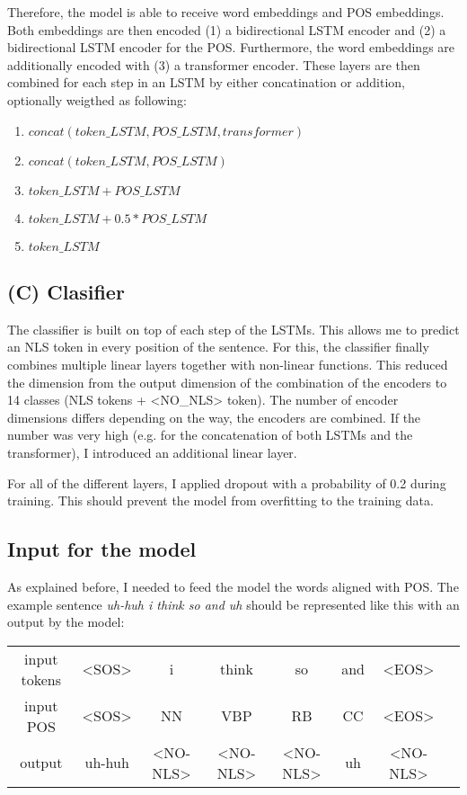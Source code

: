 \documentclass[
	11pt, %
]{fphw}
\begin{document}
Therefore, the model is able to receive word embeddings and POS embeddings. Both embeddings are then encoded (1) a bidirectional LSTM encoder and (2) a bidirectional LSTM encoder for the POS. Furthermore, the word embeddings are additionally encoded with (3) a transformer encoder. These layers are then combined for each step in an LSTM by either concatination or addition, optionally weigthed as following:
\begin{enumerate}
    \item $concat(token\_LSTM, POS\_LSTM, transformer)$
    \item $concat(token\_LSTM, POS\_LSTM)$
    \item $token\_LSTM + POS\_LSTM$
    \item $token\_LSTM + 0.5 * POS\_LSTM$
    \item $token\_LSTM$
\end{enumerate}

\subsection*{(C) Clasifier}
The classifier is built on top of each step of the LSTMs. This allows me to predict an NLS token in every position of the sentence. For this, the classifier finally combines multiple linear layers together with non-linear functions. This reduced the dimension from the output dimension of the combination of the encoders to 14 classes (NLS tokens + <NO\_NLS> token). The number of encoder dimensions differs depending on the way, the encoders are combined. If the number was very high (e.g. for the concatenation of both LSTMs and the transformer), I introduced an additional linear layer.

For all of the different layers, I applied dropout with a probability of 0.2 during training. This should prevent the model from overfitting to the training data.

\subsection*{Input for the model}
As explained before, I needed to feed the model the words aligned with POS. The example sentence \emph{uh-huh i think so and uh} should be represented like this with an output by the model:

\begin{table}[h]
    \centering
    \begin{tabular}{c || c c c c c c c}
        input  tokens & <SOS>  & i        & think    & so       & and & <EOS>    \\
        input POS     & <SOS>  & NN       & VBP      & RB       & CC  & <EOS>    \\
        \hline
        output        & uh-huh & <NO-NLS> & <NO-NLS> & <NO-NLS> & uh  & <NO-NLS>
    \end{tabular}
\end{table}
\end{document}
